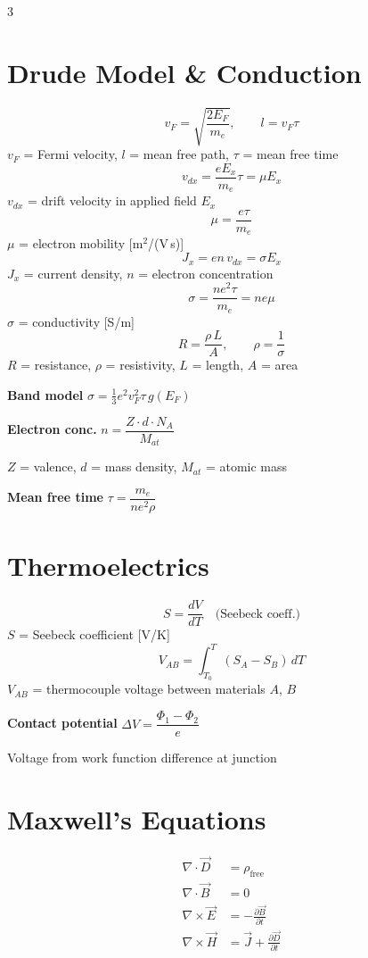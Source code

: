 \documentclass[9pt]{extarticle}
\newcommand{\eqlabel}[1]{\textbf{\scriptsize #1}\;}
\newcommand{\vardef}[1]{{\footnotesize\color{defgray}#1}}
\begin{document}
\begin{multicols}{3}

\section{Drude Model \& Conduction}
\[v_F = \sqrt{\frac{2E_F}{m_e}},\qquad l = v_F\tau\]
\vardef{$v_F$ = Fermi velocity, $l$ = mean free path, $\tau$ = mean free time}
\[v_{dx} = \frac{eE_x}{m_e}\tau = \mu E_x\]
\vardef{$v_{dx}$ = drift velocity in applied field $E_x$}
\[\mu = \frac{e\tau}{m_e}\]
\vardef{$\mu$ = electron mobility [m$^2$/(V\,s)]}
\[J_x = en\,v_{dx} = \sigma E_x\]
\vardef{$J_x$ = current density, $n$ = electron concentration}
\[\sigma = \frac{ne^2\tau}{m_e} = ne\mu\]
\vardef{$\sigma$ = conductivity [S/m]}
\[R = \frac{\rho\,L}{A},\qquad \rho = \frac{1}{\sigma}\]
\vardef{$R$ = resistance, $\rho$ = resistivity, $L$ = length, $A$ = area}

\eqlabel{Band model} $\sigma = \tfrac{1}{3}e^2v_F^2\tau\,g(E_F)$

\eqlabel{Electron conc.} $n = \dfrac{Z\cdot d\cdot N_A}{M_{at}}$

\vardef{$Z$ = valence, $d$ = mass density, $M_{at}$ = atomic mass}

\eqlabel{Mean free time} $\tau = \dfrac{m_e}{ne^2\rho}$

\section{Thermoelectrics}
\[S = \frac{dV}{dT} \quad\text{(Seebeck coeff.)}\]
\vardef{$S$ = Seebeck coefficient [V/K]}
\[V_{AB} = \int_{T_0}^{T}(S_A - S_B)\,dT\]
\vardef{$V_{AB}$ = thermocouple voltage between materials $A$, $B$}

\eqlabel{Contact potential} $\Delta V = \dfrac{\Phi_1 - \Phi_2}{e}$

\vardef{Voltage from work function difference at junction}

\section{Maxwell's Equations}
\begin{align*}
\nabla\cdot\vec{D} &= \rho_{\text{free}} \\
\nabla\cdot\vec{B} &= 0 \\
\nabla\times\vec{E} &= -\frac{\partial\vec{B}}{\partial t} \\
\nabla\times\vec{H} &= \vec{J} + \frac{\partial\vec{D}}{\partial t}
\end{align*}


\end{multicols}
\end{document}
